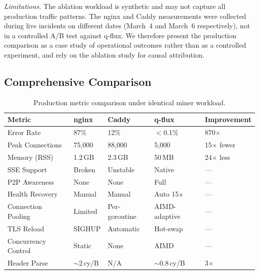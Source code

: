 \documentclass[a4paper, 11pt]{article}
\begin{document}
\emph{Limitations.} The ablation workload is synthetic and may not
capture all production traffic patterns. The nginx and Caddy
measurements were collected during live incidents on different dates
(March~4 and March~6 respectively), not in a controlled A/B test
against q-flux. We therefore present the production comparison as a
case study of operational outcomes rather than as a controlled
experiment, and rely on the ablation study for causal attribution.

\subsection{Comprehensive Comparison}
\label{sec:eval-summary}

\begin{table}[t]
\centering
\caption{Production metric comparison under identical miner workload.}
\label{tab:comparison}
\small
\begin{tabular}{@{}llll p{2.4cm}@{}}
\toprule
\textbf{Metric} & \textbf{nginx} & \textbf{Caddy} & \textbf{q-flux} & \textbf{Improvement} \\
\midrule
Error Rate             & 87\%           & 12\%           & $<$0.1\%        & 870$\times$ \\
Peak Connections       & 75{,}000       & 88{,}000       & 5{,}000         & 15$\times$ fewer \\
Memory (RSS)           & 1.2\,GB        & 2.3\,GB        & 50\,MB          & 24$\times$ less \\
SSE Support            & Broken         & Unstable       & Native          & --- \\
P2P Awareness          & None           & None           & Full            & --- \\
Health Recovery        & Manual         & Manual         & Auto 15\,s      & --- \\
Connection Pooling     & Limited        & Per-goroutine  & AIMD-adaptive   & --- \\
TLS Reload             & SIGHUP         & Automatic      & Hot-swap        & --- \\
Concurrency Control    & Static         & None           & AIMD            & --- \\
Header Parse           & $\sim$2\,cy/B  & N/A            & $\sim$0.8\,cy/B & 3$\times$ \\
\bottomrule
\end{tabular}
\end{table}
\end{document}
